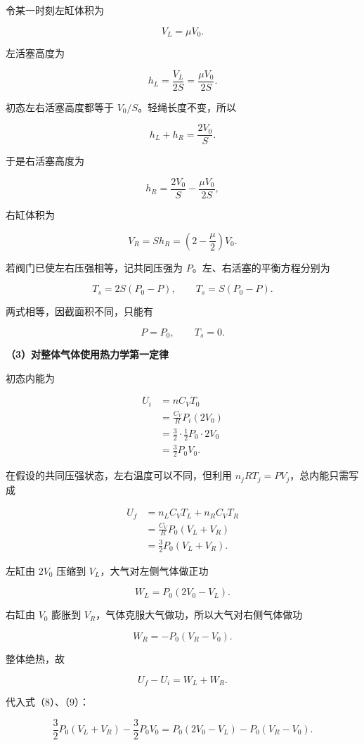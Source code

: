 \documentclass[12pt,a4paper,UTF8]{ctexart}
\begin{document}
令某一时刻左缸体积为

\[
V_L=\mu V_0.
\tag{5}
\]

左活塞高度为

\[
h_L=\frac{V_L}{2S}=\frac{\mu V_0}{2S}.
\]

初态左右活塞高度都等于 \(V_0/S\)。轻绳长度不变，所以

\[
h_L+h_R=\frac{2V_0}{S}.
\]

于是右活塞高度为

\[
h_R=\frac{2V_0}{S}-\frac{\mu V_0}{2S},
\]

右缸体积为

\[
\boxed{V_R=Sh_R=\left(2-\frac\mu2\right)V_0}.
\tag{6}
\]

若阀门已使左右压强相等，记共同压强为 \(P\)。左、右活塞的平衡方程分别为

\[
T_s=2S(P_0-P),
\qquad
T_s=S(P_0-P).
\]

两式相等，因截面积不同，只能有

\[
\boxed{P=P_0},
\qquad T_s=0.
\tag{7}
\]

\textbf{（3）对整体气体使用热力学第一定律}

初态内能为

\[
\begin{aligned}
U_i
&=nC_VT_0\\
&=\frac{C_V}{R}P_i(2V_0)\\
&=\frac32\cdot\frac12P_0\cdot2V_0\\
&=\frac32P_0V_0.
\end{aligned}
\tag{8}
\]

在假设的共同压强状态，左右温度可以不同，但利用
\(n_jRT_j=PV_j\)，总内能只需写成

\[
\begin{aligned}
U_f
&=n_LC_VT_L+n_RC_VT_R\\
&=\frac{C_V}{R}P_0(V_L+V_R)\\
&=\frac32P_0(V_L+V_R).
\end{aligned}
\tag{9}
\]

左缸由 \(2V_0\) 压缩到 \(V_L\)，大气对左侧气体做正功

\[
W_L=P_0(2V_0-V_L).
\]

右缸由 \(V_0\) 膨胀到 \(V_R\)，气体克服大气做功，所以大气对右侧气体做功

\[
W_R=-P_0(V_R-V_0).
\]

整体绝热，故

\[
U_f-U_i=W_L+W_R.
\tag{10}
\]

代入式（8）、（9）：

\[
\frac32P_0(V_L+V_R)-\frac32P_0V_0
=P_0(2V_0-V_L)-P_0(V_R-V_0).
\]
\end{document}
